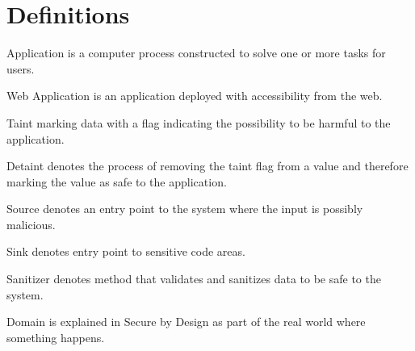 \section{Definitions}
\label{Definitions}

\begin{definition}{Application}
    is a computer process constructed to solve one or more tasks for users.
    \\
\end{definition}

\begin{definition}{Web Application}
    is an application deployed with accessibility from the web.
    \\
\end{definition}

\begin{definition}{Taint}
    marking data with a flag indicating the possibility to be harmful to the application.
    \\
\end{definition}

\begin{definition}{Detaint}
    denotes the process of removing the taint flag from a value and therefore marking the value as safe to the application.
    \\
\end{definition}

\begin{definition}{Source}
    denotes an entry point to the system where the input is possibly malicious.
    \\
\end{definition}

\begin{definition}{Sink}
    denotes entry point to sensitive code areas.
    \\
\end{definition}

\begin{definition}{Sanitizer}
    denotes method that validates and sanitizes data to be safe to the system.
    \\
\end{definition}

\begin{definition}{Domain}
    is explained in Secure by Design \parencite{sbd2018} as part of the real world where something happens.
    \\
\end{definition}


